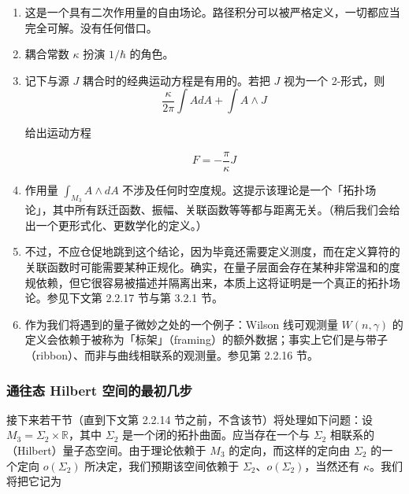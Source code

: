\begin{enumerate}
  \item 这是一个具有二次作用量的自由场论。路径积分可以被严格定义，一切都应当完全可解。没有任何借口。

  \item 耦合常数 $\kappa$ 扮演 $1/\hbar$ 的角色。

  \item 记下与源 $J$ 耦合时的经典运动方程是有用的。若把 $J$ 视为一个 2-形式，则
\begin{equation}
  \frac{\kappa}{2\pi}\int AdA+\int A\wedge J
  \tag{2.63}
  \label{eq:2.63}
\end{equation}

给出运动方程

\begin{equation}
  F=-\frac{\pi}{\kappa}J
  \tag{2.64}
  \label{eq:2.64}
\end{equation}

  \item 作用量 $\int_{M_3}A\wedge dA$ 不涉及任何时空度规。这提示该理论是一个「拓扑场论」，其中所有跃迁函数、振幅、关联函数等等都与距离无关。（稍后我们会给出一个更形式化、更数学化的定义。）

  \item 不过，不应仓促地跳到这个结论，因为毕竟还需要定义测度，而在定义算符的关联函数时可能需要某种正规化。确实，在量子层面会存在某种非常温和的度规依赖，但它很容易被描述并隔离出来，本质上这将证明是一个真正的拓扑场论。参见下文第 2.2.17 节与第 3.2.1 节。

  \item 作为我们将遇到的量子微妙之处的一个例子：Wilson 线可观测量 $W(n,\gamma)$ 的定义会依赖于被称为「标架」（framing）的额外数据；事实上它们是与带子（ribbon）、而非与曲线相联系的观测量。参见第 2.2.16 节。
\end{enumerate}

\subsubsection{通往态 Hilbert 空间的最初几步} %

接下来若干节（直到下文第 2.2.14 节之前，不含该节）将处理如下问题：设 $M_3=\Sigma_2\times\mathbb{R}$，其中 $\Sigma_2$ 是一个闭的拓扑曲面。应当存在一个与 $\Sigma_2$ 相联系的（Hilbert）量子态空间。由于理论依赖于 $M_3$ 的定向，而这样的定向由 $\Sigma_2$ 的一个定向 $o(\Sigma_2)$ 所决定，我们预期该空间依赖于 $\Sigma_2$、$o(\Sigma_2)$，当然还有 $\kappa$。我们将把它记为

